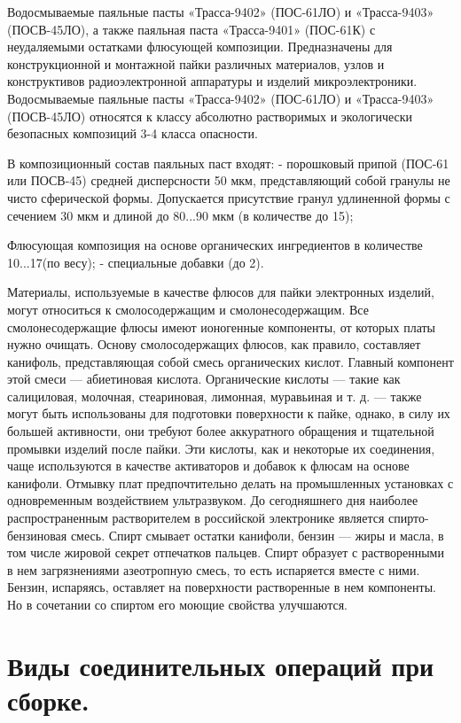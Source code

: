 \documentclass[unicode, 12pt, a4paper, oneside]{article}
\begin{document}
Водосмываемые паяльные пасты «Трасса-9402» (ПОС-61ЛО) и «Трасса-9403» (ПОСВ-45ЛО), а также паяльная паста «Трасса-9401» (ПОС-61К) с неудаляемыми остатками флюсующей композиции. Предназначены для конструкционной и монтажной пайки различных материалов, узлов и конструктивов радиоэлектронной аппаратуры и изделий микроэлектроники.  Водосмываемые паяльные пасты «Трасса-9402» (ПОС-61ЛО) и «Трасса-9403» (ПОСВ-45ЛО) относятся к классу абсолютно растворимых и экологически безопасных композиций 3-4 класса опасности.

В композиционный состав паяльных паст входят: - порошковый припой (ПОС-61 или ПОСВ-45) средней дисперсности 50 мкм, представляющий собой гранулы не чисто сферической формы. Допускается присутствие гранул удлиненной формы с сечением 30 мкм и длиной до 80...90 мкм (в количестве до 15\textdiscount);

Флюсующая композиция на основе органических ингредиентов в количестве 10...17\textdiscount (по весу); - специальные добавки (до 2\textdiscount).

Материалы, используемые в качестве флюсов для пайки электронных изделий, могут относиться к смолосодержащим и смолонесодержащим. Все смолонесодержащие флюсы имеют ионогенные компоненты, от которых платы нужно очищать. Основу смолосодержащих флюсов, как правило, составляет канифоль, представляющая собой смесь органических кислот. Главный компонент этой смеси — абиетиновая кислота. Органические кислоты — такие как салициловая, молочная, стеариновая, лимонная, муравьиная и т. д. — также могут быть использованы для подготовки поверхности к пайке, однако, в силу их большей активности, они требуют более аккуратного обращения и тщательной промывки изделий после пайки. Эти кислоты, как и некоторые их соединения, чаще используются в качестве активаторов и добавок к флюсам на основе канифоли. Отмывку плат предпочтительно делать на промышленных установках с одновременным воздействием ультразвуком. До сегодняшнего дня наиболее распространенным растворителем в российской электронике является спирто-бензиновая смесь. Спирт смывает остатки канифоли, бензин — жиры и масла, в том числе жировой секрет отпечатков пальцев. Спирт образует с растворенными в нем загрязнениями азеотропную смесь, то есть испаряется вместе с ними. Бензин, испаряясь, оставляет на поверхности растворенные в нем компоненты. Но в сочетании со спиртом его моющие свойства улучшаются.


\section{Виды соединительных операций при сборке.}
\end{document}
